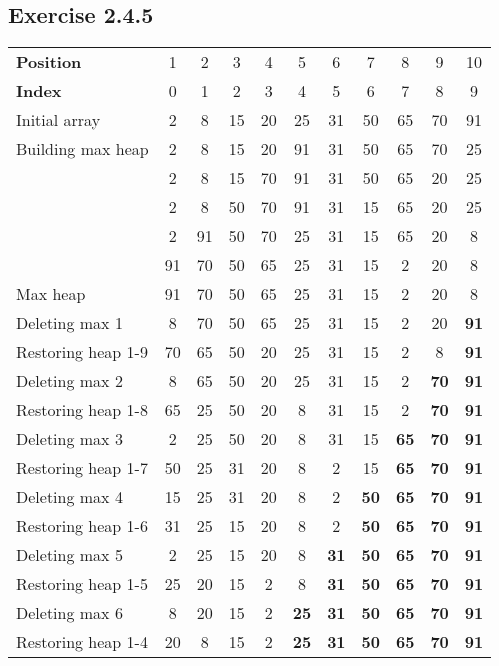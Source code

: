 \documentclass{article}
\begin{document}
\subsection*{Exercise 2.4.5}

\begin{tabular}{|l|c|c|c|c|c|c|c|c|c|c|}
\hline
\textbf{Position}& 1& 2& 3& 4& 5& 6& 7& 8& 9& 10 \\
\textbf{Index}& 0& 1& 2& 3& 4& 5& 6& 7& 8& 9 \\
\hline
Initial array& 2& 8& 15& 20& 25& 31& 50& 65& 70& 91 \\
\hline
Building max heap& 2& 8& 15& 20& 91& 31& 50& 65& 70& 25 \\
& 2& 8& 15& 70& 91& 31& 50& 65& 20& 25 \\
& 2& 8& 50& 70& 91& 31& 15& 65& 20& 25 \\
& 2& 91& 50& 70& 25& 31& 15& 65& 20& 8 \\
& 91& 70& 50& 65& 25& 31& 15& 2& 20& 8 \\
\hline
Max heap& 91& 70& 50& 65& 25& 31& 15& 2& 20& 8 \\
\hline
Deleting max 1& 8& 70& 50& 65& 25& 31& 15& 2& 20& \textbf{91} \\
Restoring heap 1-9& 70& 65& 50& 20& 25& 31& 15& 2& 8& \textbf{91} \\
\hline
Deleting max 2& 8& 65& 50& 20& 25& 31& 15& 2& \textbf{70}& \textbf{91} \\
Restoring heap 1-8& 65& 25& 50& 20& 8& 31& 15& 2& \textbf{70}& \textbf{91} \\
\hline
Deleting max 3& 2& 25& 50& 20& 8& 31& 15& \textbf{65}& \textbf{70}& \textbf{91} \\
Restoring heap 1-7& 50& 25& 31& 20& 8& 2& 15& \textbf{65}& \textbf{70}& \textbf{91} \\
\hline
Deleting max 4& 15& 25& 31& 20& 8& 2& \textbf{50}& \textbf{65}& \textbf{70}& \textbf{91} \\
Restoring heap 1-6& 31& 25& 15& 20& 8& 2& \textbf{50}& \textbf{65}& \textbf{70}& \textbf{91} \\
\hline
Deleting max 5& 2& 25& 15& 20& 8& \textbf{31}& \textbf{50}& \textbf{65}& \textbf{70}& \textbf{91} \\
Restoring heap 1-5& 25& 20& 15& 2& 8& \textbf{31}& \textbf{50}& \textbf{65}& \textbf{70}& \textbf{91} \\
\hline
Deleting max 6& 8& 20& 15& 2& \textbf{25}& \textbf{31}& \textbf{50}& \textbf{65}& \textbf{70}& \textbf{91} \\
Restoring heap 1-4& 20& 8& 15& 2& \textbf{25}& \textbf{31}& \textbf{50}& \textbf{65}& \textbf{70}& \textbf{91} \\

\end{tabular}
\end{document}
